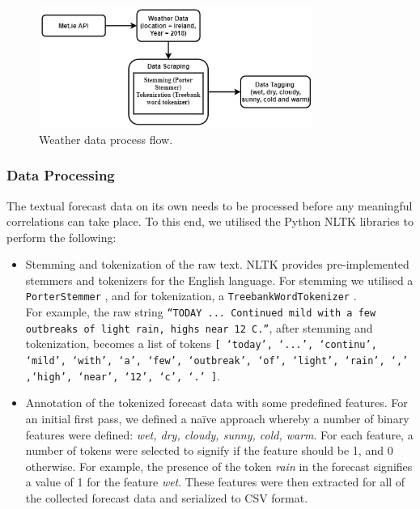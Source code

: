 \documentclass[a4paper,10pt]{article}
\begin{document}
    \begin{figure}
        \includegraphics[width=0.8\textwidth]{weather_process_flow.jpeg}
        \caption{Weather data process flow.}
        \label{fig:weather_process_flow}
    \end{figure}


    \subsubsection{Data Processing}

    The textual forecast data on its own needs to be processed before any meaningful correlations can take place. To this end, we utilised the Python NLTK libraries to perform the following:
    \begin{itemize}
        \item{
            Stemming and tokenization of the raw text. NLTK provides pre-implemented stemmers and tokenizers for the English language. For stemming we utilised a \texttt{PorterStemmer} , and for tokenization, a \texttt{TreebankWordTokenizer} . \\
            For example, the raw string \texttt{``TODAY ... Continued mild with a few outbreaks of light rain, highs near 12 C.''}, after stemming and tokenization, becomes a list of tokens \texttt{[ `today', `...', `continu', `mild', `with', `a', `few', `outbreak', `of', `light', `rain', `,' ,`high', `near', `12', `c', `.' ]}.
        }
        \item{
            Annotation of the tokenized forecast data with some predefined features. For an initial first pass, we defined a na\"{i}ve approach whereby a number of binary features were defined: \textit{wet, dry, cloudy, sunny, cold, warm}. For each feature, a number of tokens were selected to signify if the feature should be 1, and 0 otherwise. For example, the presence of the token \textit{rain} in the forecast signifies a value of 1 for the feature \textit{wet}. These features were then extracted for all of the collected forecast data and serialized to CSV format.
        }
    \end{itemize}
\end{document}
